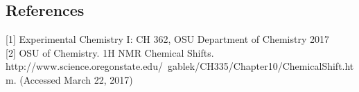 \documentclass[8.5pt,twoside,twocolumn]{article}
\begin{document}



\begin{@twocolumnfalse}
\section{References}
[1] Experimental Chemistry I: CH 362, OSU Department of Chemistry 2017\\

[2] OSU of Chemistry. 1H NMR Chemical Shifts. http://www.science.oregonstate.edu/~gablek/CH335/Chapter10/ChemicalShift.htm. (Accessed March 22, 2017)\\
\end{@twocolumnfalse}
\end{document}
